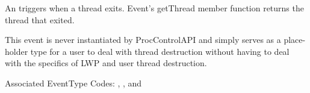 
An  triggers when a thread exits. Event's getThread
member function returns the thread that exited.

This event is never instantiated by ProcControlAPI and simply serves as a
place-holder type for a user to deal with thread destruction without having to
deal with the specifics of LWP and user thread destruction.

Associated EventType Codes: , , and
